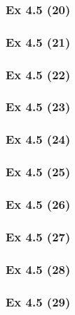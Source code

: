 \subsubsection{Ex 4.5 (20)}\label{sec:Ex_4.5.20}

\newpage		%

\subsubsection{Ex 4.5 (21)}\label{sec:Ex_4.5.21}

\subsubsection{Ex 4.5 (22)}\label{sec:Ex_4.5.22}

\subsubsection{Ex 4.5 (23)}\label{sec:Ex_4.5.23}

\subsubsection{Ex 4.5 (24)}\label{sec:Ex_4.5.24}

\subsubsection{Ex 4.5 (25)}\label{sec:Ex_4.5.25}

\subsubsection{Ex 4.5 (26)}\label{sec:Ex_4.5.26}

\subsubsection{Ex 4.5 (27)}\label{sec:Ex_4.5.27}

\subsubsection{Ex 4.5 (28)}\label{sec:Ex_4.5.28}

\subsubsection{Ex 4.5 (29)}\label{sec:Ex_4.5.29}

